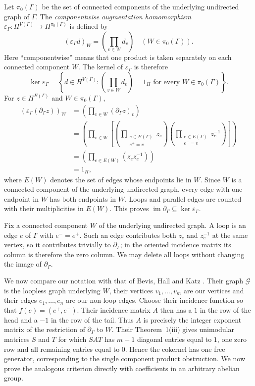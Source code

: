 \documentclass[11pt]{article}
\theoremstyle{plain}
\theoremstyle{remark}
\theoremstyle{definition}
\theoremstyle{plain}
\DeclareMathOperator{\im}{im}
\begin{document}
Let $\pi_0(\Gamma)$ be the set of connected components of the underlying
undirected graph of $\Gamma$. The \emph{componentwise augmentation homomorphism}
\(\varepsilon_\Gamma:H^{V(\Gamma)} \longrightarrow H^{\pi_0(\Gamma)}\)
is defined by
\[
(\varepsilon_\Gamma d)_W
        =
        \left(
        \prod_{v\in W}d_v
        \right)
        \quad (W\in\pi_0(\Gamma)).
\]
Here ``componentwise'' means that one product is taken separately on each
connected component $W$. The kernel of $\varepsilon_\Gamma$ is therefore
\[
        \ker\varepsilon_\Gamma
        =
        \left\{
        d\in H^{V(\Gamma)}:
        \left(
        \prod_{v\in W}d_v
        \right)=1_H
        \text{ for every }W\in\pi_0(\Gamma)
        \right\}.
\]
For $z\in H^{E(\Gamma)}$ and $W\in\pi_0(\Gamma)$,
\[
\begin{aligned}
        (\varepsilon_\Gamma(\partial_\Gamma z))_W
        &=
       \left(
        \prod_{v\in W}(\partial_\Gamma z)_v
        \right) \\[1mm]
        &=
        \left(
        \prod_{v\in W}
        \left[
        \left(
        \prod_{\substack{e\in E(\Gamma)\\ e^+=v}}z_e
        \right)
        \left(
        \prod_{\substack{e\in E(\Gamma)\\ e^-=v}}z_e^{-1}
        \right)
        \right]
        \right) \\[1mm]
        &=
        \left(
        \prod_{e\in E(W)}\left(z_ez_e^{-1}\right)
        \right) \\[1mm]
        &=1_H,
\end{aligned}
\]
where $E(W)$ denotes the set of edges whose endpoints lie in $W$. Since $W$ is
a connected component of the underlying undirected graph, every edge with one
endpoint in $W$ has both endpoints in $W$. Loops and parallel edges are counted
with their multiplicities in $E(W)$. This proves
\(\im\partial_\Gamma \subseteq \ker\varepsilon_\Gamma.\)

{Fix a connected component $W$ of the underlying undirected
graph. A loop is an edge $e$ of $\Gamma$ with $e^-=e^+$.  Such an edge contributes both $z_e$ and
$z_e^{-1}$ at the same vertex, so it contributes trivially to
$\partial_\Gamma$; in the oriented incidence matrix its column is therefore
the zero column. We may delete all loops without changing the image of
$\partial_\Gamma$.

We now compare our notation with that of Bevis, Hall and Katz
\cite[Section~II and Theorem~1(iii)]
{BevisHallKatz}. Their graph $\mathcal G$ is the loopless graph underlying
$W$, their vertices $v_1,\ldots,v_m$ are our vertices and their edges
$e_1,\ldots,e_n$ are our non-loop edges. Choose their incidence function so
that $f(e)=(e^+,e^-)$. Their incidence matrix $A$ then has a $1$ in the row
of the head and a $-1$ in the row of the tail. Thus $A$ is precisely the
integer exponent matrix of the restriction of $\partial_\Gamma$ to $W$.
Their Theorem~1(iii) gives unimodular matrices $S$ and $T$ for which $SAT$
has $m-1$ diagonal entries equal to $1$, one zero row and all remaining
entries equal to $0$. Hence the cokernel has one free generator, corresponding
to the single component product obstruction. We now prove the analogous
criterion directly with coefficients in an arbitrary abelian group.}
\end{document}
